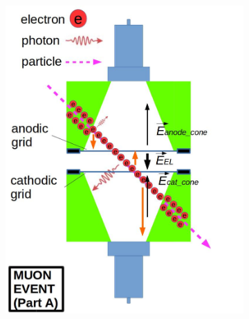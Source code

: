 \begin{figure}[!htbp]
	\centering
	\begin{subfigure}[b]{.8\textwidth}
		\centering
		\includegraphics[width=\halfwidth,clip,trim={0 0 0 0},angle=0,origin=c]{Figures/GasTest/WeiDrawEvent/MuonEventA.jpg}

\end{subfigure}
\end{figure}
